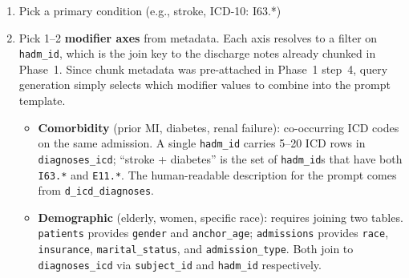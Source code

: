 \documentclass[11pt,a4paper]{article}
\newcommand{\field}[1]{\nolinkurl{#1}}
\newcommand{\importantfield}[1]{\textcolor{betterblue}{\nolinkurl{#1}}}
\newcommand{\icd}[1]{\texttt{#1}}
\begin{document}
\begin{enumerate}[leftmargin=*, itemsep=2mm]
	\item Pick a primary condition (e.g., stroke, ICD-10: I63.*)
	\item Pick 1--2 \textbf{modifier axes} from metadata. Each axis resolves to a filter on \field{hadm\_id}, which is the join key to the discharge notes already chunked in Phase~1. Since chunk metadata was pre-attached in Phase~1 step~4, query generation simply selects which modifier values to combine into the prompt template.

	      \begin{itemize}[itemsep=2pt, parsep=1pt]
		      \item \textbf{Comorbidity} (prior MI, diabetes, renal failure): co-occurring ICD codes on the same admission. A single \field{hadm\_id} carries 5--20 ICD rows in \importantfield{diagnoses\_icd}; ``stroke + diabetes'' is the set of \field{hadm\_id}s that have both \icd{I63.*} and \icd{E11.*}. The human-readable description for the prompt comes from \importantfield{d\_icd\_diagnoses}.

		      \item \textbf{Demographic} (elderly, women, specific race): requires joining two tables. \importantfield{patients} provides \field{gender} and \field{anchor\_age}; \importantfield{admissions} provides \field{race}, \field{insurance}, \field{marital\_status}, and \field{admission\_type}. Both join to \field{diagnoses\_icd} via \field{subject\_id} and \field{hadm\_id} respectively.


\end{itemize}
\end{enumerate}
\end{document}
